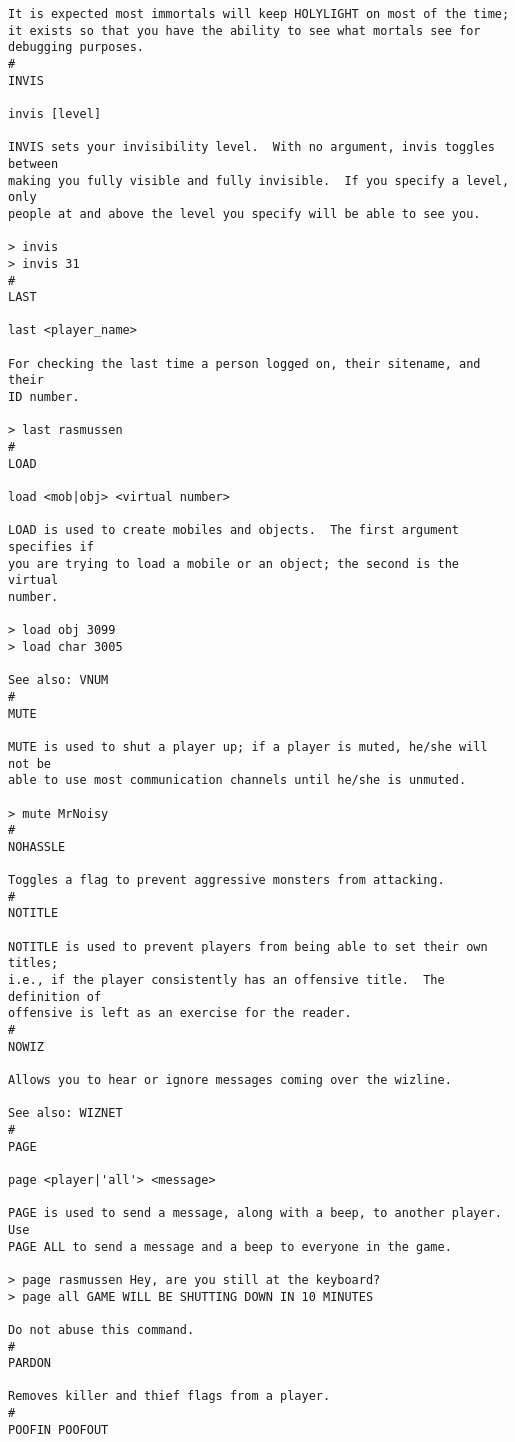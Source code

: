 \documentclass[11pt]{article}
\begin{document}
\begin{verbatim}
It is expected most immortals will keep HOLYLIGHT on most of the time;
it exists so that you have the ability to see what mortals see for
debugging purposes.
#
INVIS

invis [level]

INVIS sets your invisibility level.  With no argument, invis toggles between
making you fully visible and fully invisible.  If you specify a level, only
people at and above the level you specify will be able to see you.

> invis
> invis 31
#
LAST

last <player_name>

For checking the last time a person logged on, their sitename, and their
ID number.

> last rasmussen
#
LOAD

load <mob|obj> <virtual number>

LOAD is used to create mobiles and objects.  The first argument specifies if
you are trying to load a mobile or an object; the second is the virtual
number.

> load obj 3099
> load char 3005

See also: VNUM
#
MUTE

MUTE is used to shut a player up; if a player is muted, he/she will not be
able to use most communication channels until he/she is unmuted.

> mute MrNoisy
#
NOHASSLE

Toggles a flag to prevent aggressive monsters from attacking.
#
NOTITLE

NOTITLE is used to prevent players from being able to set their own titles;
i.e., if the player consistently has an offensive title.  The definition of
offensive is left as an exercise for the reader.
#
NOWIZ

Allows you to hear or ignore messages coming over the wizline.

See also: WIZNET
#
PAGE

page <player|'all'> <message>

PAGE is used to send a message, along with a beep, to another player.  Use
PAGE ALL to send a message and a beep to everyone in the game.

> page rasmussen Hey, are you still at the keyboard?
> page all GAME WILL BE SHUTTING DOWN IN 10 MINUTES

Do not abuse this command.
#
PARDON

Removes killer and thief flags from a player.
#
POOFIN POOFOUT


\end{verbatim}
\end{document}
